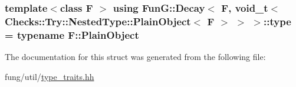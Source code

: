 \subsubsection[{\texorpdfstring{type}{type}}]{\setlength{\rightskip}{0pt plus 5cm}template$<$class F $>$ using {\bf Fun\+G\+::\+Decay}$<$ F, {\bf void\+\_\+t}$<$ Checks\+::\+Try\+::\+Nested\+Type\+::\+Plain\+Object$<$ F $>$ $>$ $>$\+::{\bf type} =  typename F\+::\+Plain\+Object}\hypertarget{structFunG_1_1Decay_3_01F_00_01void__t_3_01Checks_1_1Try_1_1NestedType_1_1PlainObject_3_01F_01_4_01_4_01_4_a27b32af38cd1fb109944b71825771648}{}\label{structFunG_1_1Decay_3_01F_00_01void__t_3_01Checks_1_1Try_1_1NestedType_1_1PlainObject_3_01F_01_4_01_4_01_4_a27b32af38cd1fb109944b71825771648}


The documentation for this struct was generated from the following file\+:\begin{DoxyCompactItemize}
\item 
fung/util/\hyperlink{type__traits_8hh}{type\+\_\+traits.\+hh}\end{DoxyCompactItemize}
